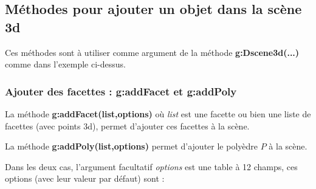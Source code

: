 \subsection{Méthodes pour ajouter un objet dans la scène 3d}

Ces méthodes sont à utiliser comme argument de la méthode \textbf{g:Dscene3d(...)} comme dans l'exemple ci-dessus.

\subsubsection{Ajouter des facettes : g:addFacet et g:addPoly}

La méthode \textbf{g:addFacet(list,options)} où \emph{list} est une facette ou bien une liste de facettes (avec points 3d), permet d'ajouter ces facettes à la scène. 

La méthode \textbf{g:addPoly(list,options)} permet d'ajouter le polyèdre $P$ à la scène. 

Dans les deux cas, l'argument facultatif \emph{options} est une table à 12 champs, ces options (avec leur valeur par défaut) sont :

